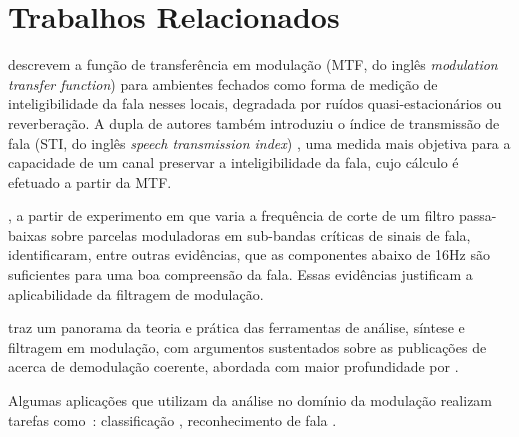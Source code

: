 \section{Trabalhos Relacionados}

\citet{houtgast1973} descrevem a função de transferência em modulação
(MTF, do inglês
\textit{modulation transfer function}) para ambientes fechados como forma de
medição de inteligibilidade da fala nesses locais, degradada por ruídos
quasi-estacionários ou reverberação. A dupla de autores também introduziu o
índice de transmissão de fala (STI, do inglês \textit{speech transmission
index}) \cite{houtgast1980}, uma medida mais objetiva para a capacidade de um
canal preservar a inteligibilidade da fala, cujo cálculo é efetuado a partir da
MTF.



\citet{drullman1994}, a partir de experimento em que varia a frequência de corte
de um filtro passa-baixas sobre parcelas moduladoras em sub-bandas críticas de
sinais de fala, identificaram, entre outras evidências, que as componentes
abaixo de 16Hz são suficientes para uma boa compreensão da fala. Essas
evidências justificam a aplicabilidade da filtragem de modulação.


\citet{schimmel2007} traz um panorama da teoria e prática das ferramentas de
análise, síntese e filtragem em modulação, com argumentos sustentados sobre as
publicações de \citet{atlas2005, atlas2003} acerca de demodulação coerente,
abordada com maior profundidade por \citet{clark2012}.


Algumas aplicações que utilizam da análise no domínio da modulação realizam
 tarefas como~\cite{paliwal2015}: classificação \cite{markaki2009},
 reconhecimento de fala \cite{hermansky1994rasta} \cite{kanedera1999relative}
 \cite{kingsbury1998} \cite{lu2010temporal} \cite{nadeu1997filtering}
 \cite{tyagi2003mel} \cite{xiao2008normalization}.  